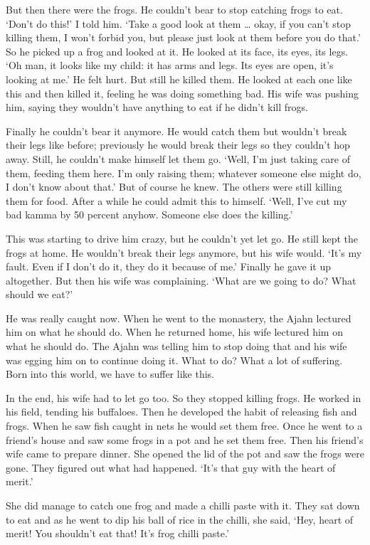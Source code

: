 But then there were the frogs. He couldn't bear to stop catching frogs to eat. `Don't do this!' I told him. `Take a good look at them \ldots{} okay, if you can't stop killing them, I won't forbid you, but please just look at them before you do that.' So he picked up a frog and looked at it. He looked at its face, its eyes, its legs. `Oh man, it looks like my child: it has arms and legs. Its eyes are open, it's looking at me.' He felt hurt. But still he killed them. He looked at each one like this and then killed it, feeling he was doing something bad. His wife was pushing him, saying they wouldn't have anything to eat if he didn't kill frogs.

Finally he couldn't bear it anymore. He would catch them but wouldn't break their legs like before; previously he would break their legs so they couldn't hop away. Still, he couldn't make himself let them go. `Well, I'm just taking care of them, feeding them here. I'm only raising them; whatever someone else might do, I don't know about that.' But of course he knew. The others were still killing them for food. After a while he could admit this to himself. `Well, I've cut my bad kamma by 50 percent anyhow. Someone else does the killing.'

This was starting to drive him crazy, but he couldn't yet let go. He still kept the frogs at home. He wouldn't break their legs anymore, but his wife would. `It's my fault. Even if I don't do it, they do it because of me.' Finally he gave it up altogether. But then his wife was complaining. `What are we going to do? What should we eat?'

He was really caught now. When he went to the monastery, the Ajahn lectured him on what he should do. When he returned home, his wife lectured him on what he should do. The Ajahn was telling him to stop doing that and his wife was egging him on to continue doing it. What to do? What a lot of suffering. Born into this world, we have to suffer like this.

In the end, his wife had to let go too. So they stopped killing frogs. He worked in his field, tending his buffaloes. Then he developed the habit of releasing fish and frogs. When he saw fish caught in nets he would set them free. Once he went to a friend's house and saw some frogs in a pot and he set them free. Then his friend's wife came to prepare dinner. She opened the lid of the pot and saw the frogs were gone. They figured out what had happened. `It's that guy with the heart of merit.'

She did manage to catch one frog and made a chilli paste with it. They sat down to eat and as he went to dip his ball of rice in the chilli, she said, `Hey, heart of merit! You shouldn't eat that! It's frog chilli paste.'


